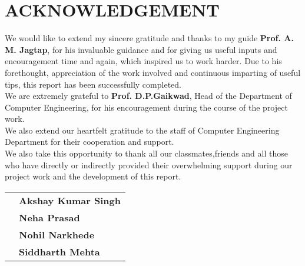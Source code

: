 \chapter*{\Huge\textbf{ACKNOWLEDGEMENT}}

 We would like to extend my sincere gratitude and thanks to my guide \textbf{Prof. A. M. Jagtap}, for his invaluable guidance and for giving us useful inputs and encouragement time and again, which inspired us to work harder.  Due to his forethought, appreciation of the work involved and continuous imparting of useful tips, this report has been successfully completed.\\

\noindent
We are extremely grateful to \textbf{Prof. D.P.Gaikwad}, Head of the Department of Computer Engineering, for his  encouragement during the course of the project work.\\   

\noindent
We also extend our heartfelt gratitude to the staff of Computer Engineering Department for their cooperation and support. \\

\noindent
We also take this opportunity to thank all our classmates,friends and all those who have directly or indirectly provided their overwhelming support during  our project work and the development of this report.\\






\vspace{0.5in}
\begin{tabular}{ll}
 & \hspace{3.5in} \bf Akshay Kumar Singh\\
 & \hspace{3.5in} \bf Neha Prasad\\
 & \hspace{3.5in} \bf Nohil Narkhede\\
 & \hspace{3.5in} \bf Siddharth Mehta\\
\end{tabular}
